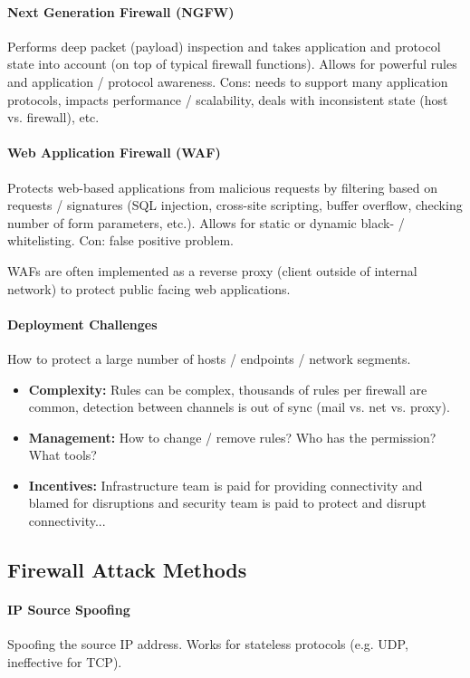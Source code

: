 \paragraph{Next Generation Firewall (NGFW)}
Performs deep packet (payload) inspection and takes application and protocol state into account (on top of typical firewall functions). Allows for powerful rules and application / protocol awareness. Cons: needs to support many application protocols, impacts performance / scalability, deals with inconsistent state (host vs. firewall), etc. %

\paragraph{Web Application Firewall (WAF)}
Protects web-based applications from malicious requests by filtering based on requests / signatures (SQL injection, cross-site scripting, buffer overflow, checking number of form parameters, etc.). Allows for static or dynamic black- / whitelisting. Con: false positive problem.

WAFs are often implemented as a reverse proxy (client outside of internal network) to protect public facing web applications.

\paragraph{Deployment Challenges}
How to protect a large number of hosts / endpoints / network segments.

\begin{itemize}
    \item \textbf{Complexity:} Rules can be complex, thousands of rules per firewall are common, detection between channels is out of sync (mail vs. net vs. proxy).
    \item \textbf{Management:} How to change / remove rules? Who has the permission? What tools?
    \item \textbf{Incentives:} Infrastructure team is paid for providing connectivity and blamed for disruptions and security team is paid to protect and disrupt connectivity...
\end{itemize}

\subsection{Firewall Attack Methods}

\paragraph{IP Source Spoofing}
Spoofing the source IP address. Works for stateless protocols (e.g. UDP, ineffective for TCP).

